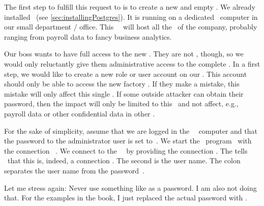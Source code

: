 %
%
%
%
%
The first step to fulfill this request to is to create a new and empty \db.
We already installed \postgresql\ (see \cref{sec:installingPostgres}).
It is running on a dedicated \server\ computer in our small  department / office.
This \db\ \server\ will host all the \dbs\ of the company, probably ranging from payroll data to fancy business analytics.

Our boss wants to have full access to the new \db.
They are not , though, so we would only reluctantly give them administrative access to the complete \server.
In a first step, we would like to create a new role or user account on our \dbms.
This account should only be able to access the new factory \db.
If they make a mistake, this mistake will only affect this single \db.
If some outside attacker can obtain their password, then the impact will only be limited to this \db\ and not affect, e.g., payroll data or other confidential data in other \dbs.

For the sake of simplicity, assume that we are logged in the \db~\server\ computer and that the password to the administrator user  is set to~.
We start the \client\ program \psql\ with the connection ~\cite{PGDG:PD}.
We connect to the \postgresql\ \server\ by providing the connection  .
The  tells \psql\ that this is, indeed, a connection .
The second  is the user name.
The colon~\inQuotes{\textil{:}} separates the user name from the password~.

Let me stress again:
Never use something like  as a password.
I am also not doing that.
For the examples in the book, I just replaced the actual password with .

